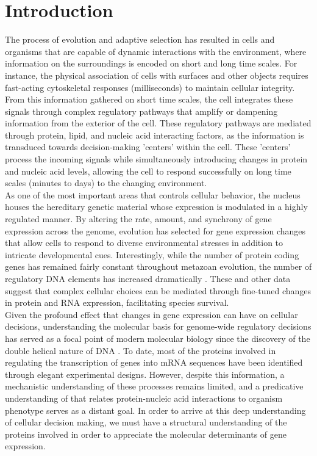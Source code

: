 \chapter{Introduction}

\indent The process of evolution and adaptive selection has resulted in cells and organisms that are capable of dynamic interactions with the environment, where information on the surroundings is encoded on short and long time scales. For instance, the physical association of cells with surfaces and other objects requires fast-acting cytoskeletal responses (milliseconds) to maintain cellular integrity. From this information gathered on short time scales, the cell integrates these signals through complex regulatory pathways that amplify or dampening information from the exterior of the cell. These regulatory pathways are mediated through protein, lipid, and nucleic acid interacting factors, as the information is transduced towards decision-making 'centers' within the cell.  These 'centers' process the incoming signals while simultaneously introducing changes in protein and nucleic acid levels, allowing the cell to respond successfully on long time scales (minutes to days) to the changing environment.\\
\indent As one of the most important areas that controls cellular behavior, the nucleus houses the hereditary genetic material whose expression is modulated in a highly regulated manner. By altering the rate, amount, and synchrony of gene expression across the genome, evolution has selected for gene expression changes that allow cells to respond to diverse environmental stresses in addition to intricate developmental cues. Interestingly, while the number of protein coding genes has remained fairly constant throughout metazoan evolution, the number of regulatory DNA elements has increased dramatically \cite{Levine_1710}. These and other data suggest that complex cellular choices can be mediated through fine-tuned changes in protein and RNA expression, facilitating species survival. \\
\indent Given the profound effect that changes in gene expression can have on cellular decisions, understanding the molecular basis for genome-wide regulatory decisions has served as a focal point of modern molecular biology since the discovery of the double helical nature of DNA \cite{Watson_4017}. To date, most of the proteins involved in regulating the transcription of genes into mRNA sequences have been identified through elegant experimental designs.  However, despite this information, a mechanistic understanding of these processes remains limited, and a predicative understanding of that relates protein-nucleic acid interactions to organism phenotype serves as a distant goal. In order to arrive at this deep understanding of cellular decision making, we must have a structural understanding of the proteins involved in order to appreciate the molecular determinants of gene expression. 

